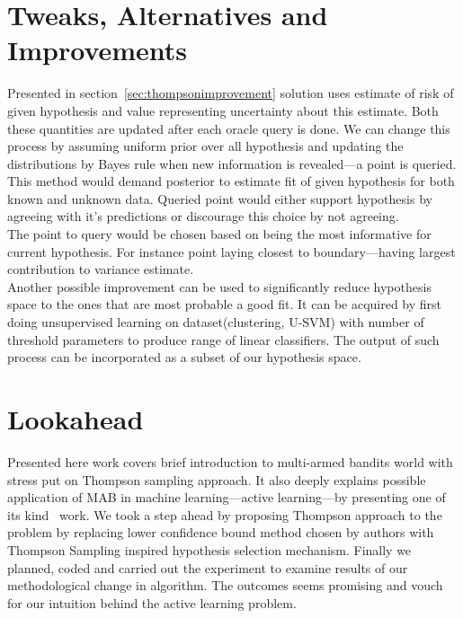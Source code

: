 \documentclass[12pt, a4paper, pdflatex, leqno]{report}
\begin{document}
\section{Tweaks, Alternatives and Improvements\label{sec:qimprove}}
Presented in section~\ref{sec:thompsonimprovement} solution uses estimate of risk of given hypothesis and value representing uncertainty about this estimate. Both these quantities are updated after each oracle query is done. We can change this process by assuming uniform prior over all hypothesis and updating the distributions by Bayes rule when new information is revealed---a point is queried.\\
This method would demand posterior to estimate fit of given hypothesis for both known and unknown data. Queried point would either support hypothesis by agreeing with it's predictions or discourage this choice by not agreeing.\\
The point to query would be chosen based on being the most informative for current hypothesis. For instance point laying closest to boundary---having largest contribution to variance estimate.\\


Another possible improvement can be used to significantly reduce hypothesis space to the ones that are most probable a good fit. It can be acquired by first doing unsupervised learning on dataset(clustering, U-SVM) with number of threshold parameters to produce range of linear classifiers. The output of such process can be incorporated as a subset of our hypothesis space.\\


\section{Lookahead}
Presented here work covers brief introduction to multi-armed bandits world with stress put on Thompson sampling approach. It also deeply explains possible application of MAB in machine learning---active learning---by presenting one of its kind~\citep{DBLP:journals/corr/GantiG13} work. We took a step ahead by proposing Thompson approach to the problem by replacing lower confidence bound method chosen by authors with Thompson Sampling inspired hypothesis selection mechanism. Finally we planned, coded and carried out the experiment to examine results of our methodological change in algorithm. The outcomes seems promising and vouch for our intuition behind the active learning problem.\\
\end{document}
